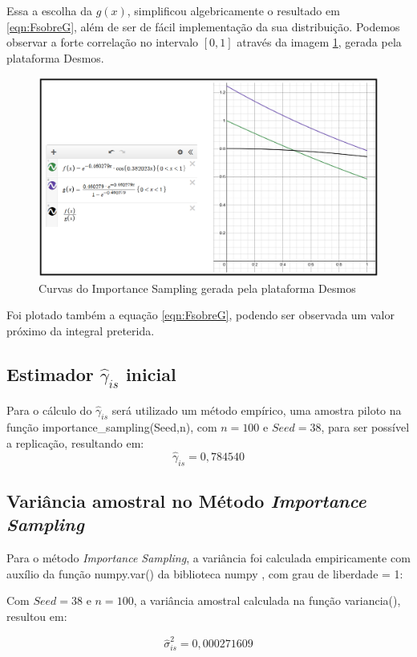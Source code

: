 \documentclass{article}
\begin{document}
Essa a escolha da $g(x)$, simplificou algebricamente o resultado em \ref{eqn:FsobreG}, além de ser de fácil implementação da sua distribuição. Podemos observar a forte correlação no intervalo $[0,1]$ através da imagem \ref{fig:ImpSamDesmos}, gerada pela plataforma Desmos\cite{desmos}. 

\begin{figure}[H]
    \centering
    \includegraphics[width=.7\linewidth]{Imagens/Desmos_ImportanceSampling.png}
    \caption{Curvas do Importance Sampling gerada pela plataforma Desmos}
    \label{fig:ImpSamDesmos}
\end{figure}

Foi plotado também a equação \ref{eqn:FsobreG}, podendo ser observada um valor próximo da integral preterida.




\subsection{Estimador $\hat{\gamma}_{is}$ inicial}
Para o cálculo do $\hat{\gamma}_{is}$ será utilizado um método empírico, uma amostra piloto na função importance\_sampling(Seed,n), com $n=100$ e $Seed=38$, para ser possível a replicação, resultando em:
\[
    \hat{\gamma}_{is} = 0,784540
\]

\subsection{Variância amostral no Método \textit{Importance Sampling}}

Para o método \textit{Importance Sampling}, a variância foi calculada empiricamente com auxílio da função numpy.var() da biblioteca numpy \cite{harris2020array}, com grau de liberdade = 1:

Com $Seed=38$ e $n=100$, a variância amostral calculada na função variancia(), resultou em:

\[
    \hat{\sigma}_{is}^2 = 0,000271609
\]
\end{document}
